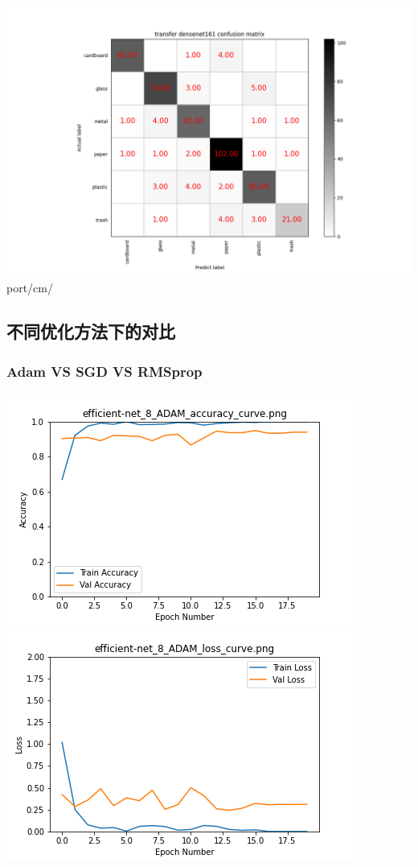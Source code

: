\documentclass[UTF8]{ctexart}
\begin{document}
\includegraphics[scale=0.5]{cm/dense161.png} port/cm/

\subsection{不同优化方法下的对比}
\subsubsection{Adam VS SGD VS RMSprop}

\includegraphics[scale=0.5]{image/efficient-net_8_ADAM_accuracy_curve.png} 
\includegraphics[scale=0.5]{image/efficient-net_8_ADAM_loss_curve.png}
\end{document}
